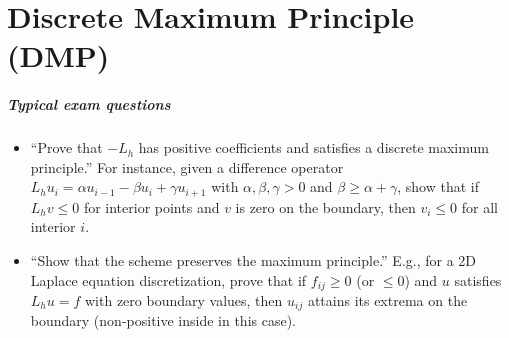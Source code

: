 \documentclass[a4paper,11pt]{report}
\begin{document}
\chapter{Discrete Maximum Principle (DMP)}

\paragraph{Typical exam questions}
\begin{itemize}
    \item \enquote{Prove that $-L_h$ has positive coefficients and satisfies a discrete maximum principle.} For instance, given a difference operator $L_h u_i = \alpha u_{i-1} - \beta u_i + \gamma u_{i+1}$ with $\alpha,\beta,\gamma>0$ and $\beta \ge \alpha+\gamma$, show that if $L_h v \le 0$ for interior points and $v$ is zero on the boundary, then $v_i \le 0$ for all interior $i$.
    \item \enquote{Show that the scheme preserves the maximum principle.} E.g., for a 2D Laplace equation discretization, prove that if $f_{ij}\ge0$ (or $\le0$) and $u$ satisfies $L_h u = f$ with zero boundary values, then $u_{ij}$ attains its extrema on the boundary (non-positive inside in this case).
\end{itemize}
\end{document}
